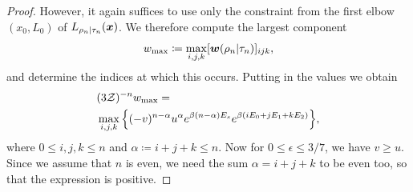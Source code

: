 \documentclass[pra,
aps,
twocolumn,
superscriptaddress,
groupedaddress,
nofootinbib,
reprint
]{revtex4-1}
\begin{document}
\begin{proof}
However, it again suffices to use only the constraint from the first elbow $(x_0, L_0)$ of $L_{\rho_n|\tau_n}(\boldsymbol{x})$. We therefore compute the largest component 
\begin{equation}
	w_{\rm max} \coloneqq \max_{i,j,k} [\boldsymbol{w}(\rho_n | \tau_n)]_{ijk},
\end{equation}
and determine the indices at which this occurs.
Putting in the values we obtain
\begin{align}
	&(3\mathcal{Z})^{-n}w_{\rm max} = \nonumber\\
	&\max\limits_{i,j,k}\Big\{ (-v)^{n-\alpha} u^{\alpha} e^{\beta (n-\alpha)E_s} e^{\beta ( i E_0 + j E_1 + k E_2 )} \Big\}, \label{eq:max_slope}
\end{align}
where $0 \leq i,j,k \leq n$ and $\alpha \coloneqq i+j+k \leq n$.
Now for $0 \leq \epsilon \leq 3/7$, we have $v \geq u$. Since we assume that $n$ is even, we need the sum $\alpha = i+j+k$ to be even too, so that the expression is positive. 


\end{proof}
\end{document}
